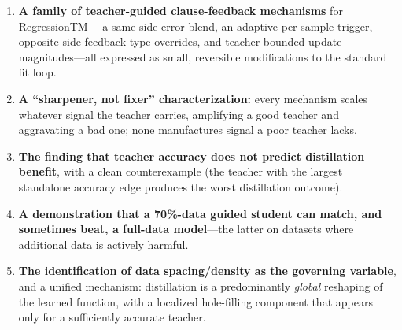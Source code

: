 \begin{enumerate}
  \item \textbf{A family of teacher-guided clause-feedback mechanisms} for RegressionTM
    ---a same-side error blend, an adaptive per-sample trigger, opposite-side
    feedback-type overrides, and teacher-bounded update magnitudes---all expressed as
    small, reversible modifications to the standard fit loop.
  \item \textbf{A ``sharpener, not fixer'' characterization:} every mechanism scales
    whatever signal the teacher carries, amplifying a good teacher and aggravating a bad
    one; none manufactures signal a poor teacher lacks.
  \item \textbf{The finding that teacher accuracy does not predict distillation benefit},
    with a clean counterexample (the teacher with the largest standalone accuracy edge
    produces the worst distillation outcome).
  \item \textbf{A demonstration that a 70\%-data guided student can match, and sometimes
    beat, a full-data model}---the latter on datasets where additional data is actively
    harmful.
  \item \textbf{The identification of data spacing/density as the governing variable},
    and a unified mechanism: distillation is a predominantly \emph{global} reshaping of
    the learned function, with a localized hole-filling component that appears only for a
    sufficiently accurate teacher.
\end{enumerate}
